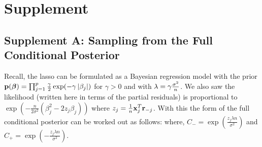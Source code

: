 \section*{Supplement}

\subsection{Supplement A: Sampling from the Full Conditional Posterior}\label{Sup:A}


Recall, the lasso can be formulated as a Bayesian regression model with the prior $\mathbf{p}(\boldsymbol{\beta}) = \prod_{j = 1}^{p} \frac{\gamma}{2}\exp(-\gamma \left\lvert\beta_j\right\rvert)$ for $\gamma > 0$ and with $\lambda = \gamma \frac{\sigma^2}{n}$. We also saw the likelihood (written here in terms of the partial residuals) is proportional to $\exp(-\frac{n}{2\sigma^2} (\beta_j^2 - 2z_j\beta_j))$ where $z_{j} = \frac{1}{n} \mathbf{x}_{j}^{T}\mathbf{r}_{-j}$.  With this the form of the full conditional posterior can be worked out as follows:
where, $C_{-} = \exp(\frac{z_j \lambda n}{\sigma^2})$ and $C_{+} = \exp(-\frac{z_j \lambda n}{\sigma^2})$.

